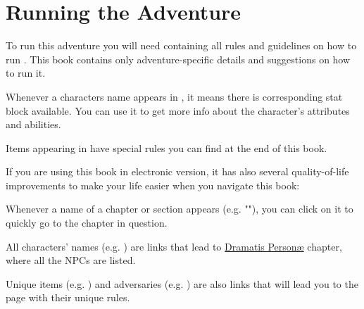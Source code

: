 \section{Running the Adventure}
\label{sec:runningAdventure}

To run this adventure you will need \handbook{} containing all rules and guidelines on how to run \cosmereRPG{}. This book contains only adventure-specific details and suggestions on how to run it.


Whenever a characters name appears in , it means there is corresponding stat block available. You can use it to get more info about the character's attributes and abilities.

Items appearing in  have special rules you can find at the end of this book.




If you are using this book in electronic version, it has also several quality-of-life improvements to make your life easier when you navigate this book:

Whenever a name of a chapter or section appears (e.g. ""), you can click on it to quickly go to the chapter in question.

All characters' names (e.g. \npcSjaAnat{}) are links that lead to \hyperref[personae]{Dramatis Person\ae} chapter, where all the NPCs are listed.

Unique items (e.g. \lootDustcaster{}) and adversaries (e.g. \enemyCultist{}) are also links that will lead you to the page with their unique rules. 




